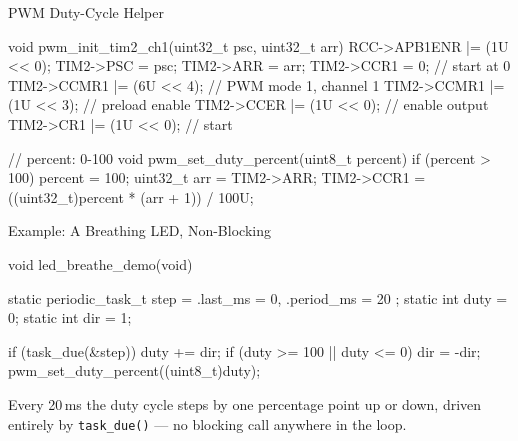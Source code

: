 \documentclass[9pt,aspectratio=169,xcolor=table]{beamer}
\begin{document}
\begin{frame}[fragile]{PWM Duty-Cycle Helper}
\begin{cc}[basicstyle=\ttfamily\small]
		void pwm_init_tim2_ch1(uint32_t psc, uint32_t arr)
		{
			RCC->APB1ENR |= (1U << 0);
			TIM2->PSC = psc;
			TIM2->ARR = arr;
			TIM2->CCR1 = 0;                // start at 0%
			TIM2->CCMR1 |= (6U << 4);      // PWM mode 1, channel 1
			TIM2->CCMR1 |= (1U << 3);      // preload enable
			TIM2->CCER  |= (1U << 0);      // enable output
			TIM2->CR1   |= (1U << 0);      // start
		}

		// percent: 0-100
		void pwm_set_duty_percent(uint8_t percent)
		{
			if (percent > 100) percent = 100;
			uint32_t arr = TIM2->ARR;
			TIM2->CCR1 = ((uint32_t)percent * (arr + 1)) / 100U;
		}
	\end{cc}
\end{frame}

\begin{frame}[fragile]{Example: A Breathing LED, Non-Blocking}
\begin{cc}[basicstyle=\ttfamily\small]
		void led_breathe_demo(void)
		{
			static periodic_task_t step = { .last_ms = 0, .period_ms = 20 };
			static int duty = 0;
			static int dir  = 1;

			if (task_due(&step)) {
				duty += dir;
				if (duty >= 100 || duty <= 0) dir = -dir;
				pwm_set_duty_percent((uint8_t)duty);
			}
		}
	\end{cc}
	{\small Every 20\,ms the duty cycle steps by one percentage point up or
		down, driven entirely by \texttt{task\_due()} --- no blocking call
		anywhere in the loop.}
\end{frame}
\end{document}
